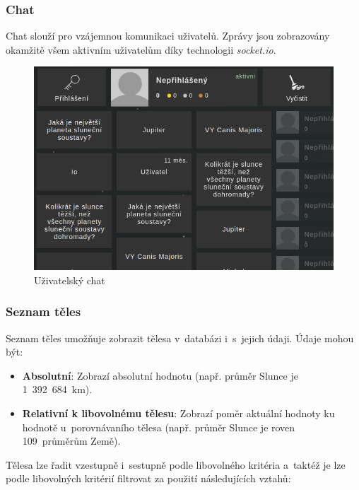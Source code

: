 \documentclass[a4paper,12pt]{article}
\begin{document}
\subsubsection{Chat}

Chat slouží pro vzájemnou komunikaci uživatelů. Zprávy jsou zobrazovány okamžitě všem aktivním uživatelům díky technologii \textit{socket.io}.

\begin{figure}[H]
\begin{center}
\includegraphics[width=350pt]{Images/Overview.png}
\caption{Uživatelský chat}
\label{BodiesList}
\end{center}
\end{figure}


\subsubsection{Seznam těles}

Seznam těles umožňuje zobrazit tělesa v~databázi i~s~jejich údaji. Údaje mohou být:

\begin{itemize}
\item \textbf{Absolutní}: Zobrazí absolutní hodnotu (např. průměr Slunce je 1~392~684~km).
\item \textbf{Relativní k libovolnému tělesu}: Zobrazí poměr aktuální hodnoty ku hodnotě u~porovnávaního tělesa (např. průměr Slunce je roven 109~průměrům Země).
\end{itemize}

Tělesa lze řadit vzestupně i~sestupně podle libovolného kritéria a~taktéž je lze podle libovolných kritérií filtrovat za použití následujících vztahů:
\end{document}
